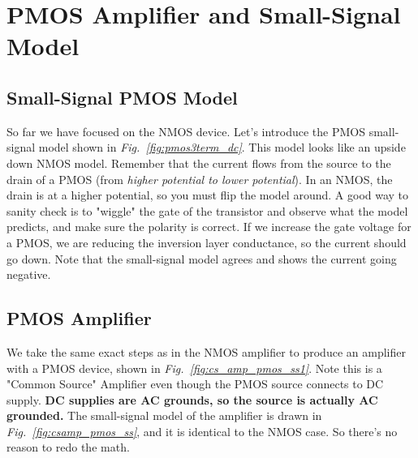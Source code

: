 \section{PMOS Amplifier and Small-Signal Model}
\subsection{Small-Signal PMOS Model}
So far we have focused on the NMOS device. Let's introduce the PMOS small-signal model shown in \emph{Fig.~\ref{fig:pmos3term_dc}}.  This model looks like an upside down NMOS model.  Remember that the current flows from the source to the drain of a PMOS (from \textit{higher potential to lower potential}).  In an NMOS, the drain is at a higher potential, so you must flip the model around.   A good way to sanity check is to "wiggle" the gate of the transistor and observe what the model predicts, and make sure the polarity is correct.  If we increase the gate voltage for a PMOS, we are reducing the inversion layer conductance, so the current should go down. Note that the small-signal model agrees and shows the current going negative.
\subsection{PMOS Amplifier}
We take the same exact steps as in the NMOS amplifier to produce an amplifier with a PMOS device, shown in \emph{Fig.~\ref{fig:cs_amp_pmos_ss1}}.  Note this is a "Common Source" Amplifier even though the PMOS source connects to DC supply.  \textbf{DC supplies are AC grounds, so the source is actually AC grounded.}   The small-signal model of the amplifier is drawn in \emph{Fig.~\ref{fig:csamp_pmos_ss}}, and it is identical to the NMOS case.  So there's no reason to redo the math.

